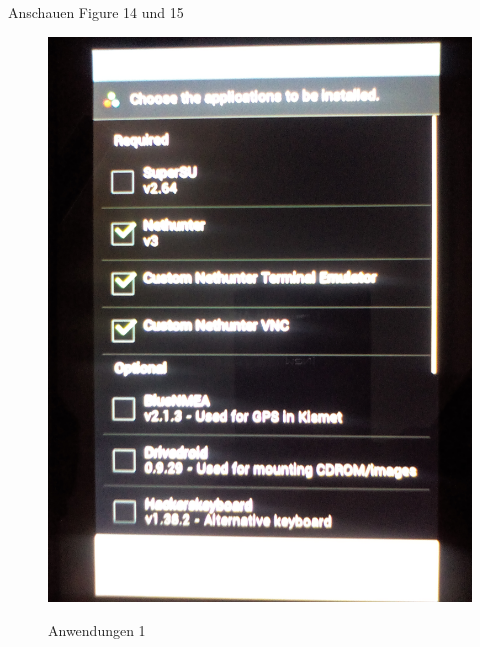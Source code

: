 \documentclass[11pt,a4paper]{article}
\begin{document}
Anschauen Figure 14 und 15\\

\begin{figure}[H]
\begin{center} \includegraphics[scale=0.1]{./Image/img14}  \\
\caption{Anwendungen 1}
\end{center}
\end{figure} 
\end{document}
